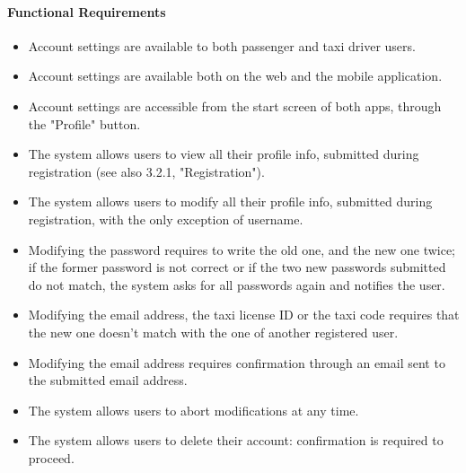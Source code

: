 	\paragraph{Functional Requirements}
		\begin{itemize}
			\item Account settings are available to both passenger and taxi driver users.
			\item Account settings are available both on the web and the mobile application.
			\item Account settings are accessible from the start screen of both apps, through the "Profile" button.
			\item The system allows users to view all their profile info, submitted during registration (see also 3.2.1, "Registration").
			\item The system allows users to modify all their profile info, submitted during registration, with the only exception of username.
			\item Modifying the password requires to write the old one, and the new one twice; if the former password is not correct or if the two new passwords submitted do not match, the system asks for all passwords again and notifies the user.
			\item Modifying the email address, the taxi license ID or the taxi code requires that the new one doesn't match with the one of another registered user.
			\item Modifying the email address requires confirmation through an email sent to the submitted email address.
			\item The system allows users to abort modifications at any time.
			\item The system allows users to delete their account: confirmation is required to proceed.
		\end{itemize}
